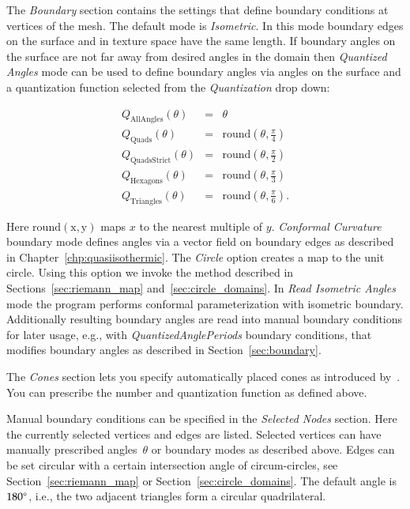 \documentclass[Thesis.tex]{subfiles}
\begin{document}
The \emph{Boundary} section contains the settings that define boundary conditions at vertices of the mesh. 
The default mode is \emph{Isometric}. In this mode boundary edges on the surface and in texture space have the same length. If boundary angles on the surface are not far away from desired angles in the domain then \emph{Quantized Angles} mode can be used to define boundary angles via angles on the surface and a quantization function selected from the \emph{Quantization} drop down:

\begin{eqnarray*}
	Q_{\mathrm{AllAngles}}(\theta) &=& \theta \\
	Q_{\mathrm{Quads}}(\theta) &=& \mathrm{round}\left(\theta, \frac{\pi}{4}\right) \\
	Q_{\mathrm{QuadsStrict}}(\theta) &=& \mathrm{round}\left(\theta, \frac{\pi}{2}\right) \\
	Q_{\mathrm{Hexagons}}(\theta) &=& \mathrm{round}\left(\theta, \frac{\pi}{3}\right) \\
	Q_{\mathrm{Triangles}}(\theta) &=& \mathrm{round}\left(\theta, \frac{\pi}{6}\right).
\end{eqnarray*}

Here $\mathrm{round(x,y)}$ maps $x$ to the nearest multiple of $y$.
\emph{Conformal Curvature} boundary mode defines angles via a vector field on boundary edges as described in Chapter~\ref{chp:quasiisothermic}. 
The \emph{Circle} option creates a map to the unit circle. 
Using this option we invoke the method described in Sections~\ref{sec:riemann_map} and~\ref{sec:circle_domains}. 
In \emph{Read Isometric Angles} mode the program performs conformal parameterization with isometric boundary. 
Additionally resulting boundary angles are read into manual boundary conditions for later usage, e.g., with \emph{QuantizedAnglePeriods} boundary conditions, that modifies boundary angles as described in Section~\ref{sec:boundary}.

The \emph{Cones} section lets you specify automatically placed cones as introduced by~\cite{Springborn2008}. You can prescribe the number and quantization function as defined above.

Manual boundary conditions can be specified in the \emph{Selected Nodes} section. 
Here the currently selected vertices and edges are listed. 
Selected vertices can have manually prescribed angles~$\theta$ or boundary modes as described above. 
Edges can be set circular with a certain intersection angle of circum-circles, see Section~\ref{sec:riemann_map} or Section~\ref{sec:circle_domains}. 
The default angle is $180\degree$, i.e., the two adjacent triangles form a circular quadrilateral.
\end{document}
